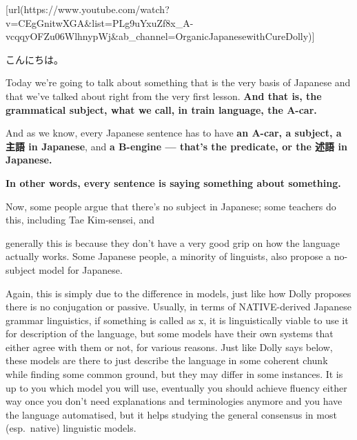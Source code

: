 \startsectionlevel[title={{\bf 89. De-mystifying Japanese. The Universal Subject}},reference={de-mystifying-japanese.-the-universal-subject}]

[url(https://www.youtube.com/watch?v=CEgGnitwXGA&list=PLg9uYxuZf8x_A-vcqqyOFZu06WlhnypWj&ab_channel=OrganicJapanesewithCureDolly)]

こんにちは。

Today we're going to talk about something that is the very basis of Japanese and that we've talked about right from the very first lesson. {\bf And that is, the grammatical subject, what we call, in train language, the A-car.}

{}

And as we know, every Japanese sentence has to have {\bf an A-car, a subject, a 主語 in Japanese}, and {\bf a B-engine --- that's the predicate, or the 述語 in Japanese.}

{\bf In other words, every sentence is saying something about something.}

{}

Now, some people argue that there's no subject in Japanese; some teachers do this, including Tae Kim-sensei, and

{}\crlf
generally this is because they don't have a very good grip on how the language actually works. Some Japanese people, a minority of linguists, also propose a no-subject model for Japanese.

Again, this is simply due to the difference in models, just like how Dolly proposes there is no conjugation or passive. Usually, in terms of NATIVE-derived Japanese grammar linguistics, if something is called as x, it is linguistically viable to use it for description of the language, but some models have their own systems that either agree with them or not, for various reasons.\crlf
Just like Dolly says below, these models are there to just describe the language in some coherent chunk while finding some common ground, but they may differ in some instances.\crlf
It is up to you which model you will use, eventually you should achieve fluency either way once you don't need explanations and terminologies anymore and you have the language automatised, but it helps studying the general consensus in most (esp.~native) linguistic models.

{}

